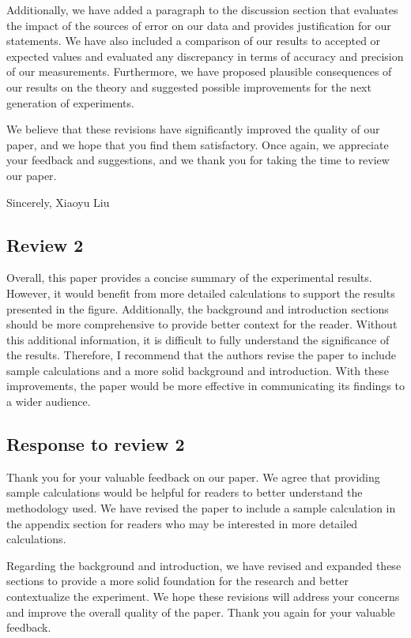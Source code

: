 Additionally, we have added a paragraph to the discussion section that evaluates the impact of the sources of error on our data and provides justification for our statements. We have also included a comparison of our results to accepted or expected values and evaluated any discrepancy in terms of accuracy and precision of our measurements. Furthermore, we have proposed plausible consequences of our results on the theory and suggested possible improvements for the next generation of experiments.

We believe that these revisions have significantly improved the quality of our paper, and we hope that you find them satisfactory. Once again, we appreciate your feedback and suggestions, and we thank you for taking the time to review our paper.

Sincerely,
Xiaoyu Liu


\subsection*{Review 2}
Overall, this paper provides a concise summary of the experimental results. However, it would benefit from more detailed calculations to support the results presented in the figure. Additionally, the background and introduction sections should be more comprehensive to provide better context for the reader. Without this additional information, it is difficult to fully understand the significance of the results. Therefore, I recommend that the authors revise the paper to include sample calculations and a more solid background and introduction. With these improvements, the paper would be more effective in communicating its findings to a wider audience.


\subsection*{Response to review 2}

Thank you for your valuable feedback on our paper. We agree that providing sample calculations would be helpful for readers to better understand the methodology used. We have revised the paper to include a sample calculation in the appendix section for readers who may be interested in more detailed calculations.

Regarding the background and introduction, we have revised and expanded these sections to provide a more solid foundation for the research and better contextualize the experiment. We hope these revisions will address your concerns and improve the overall quality of the paper. Thank you again for your valuable feedback.

